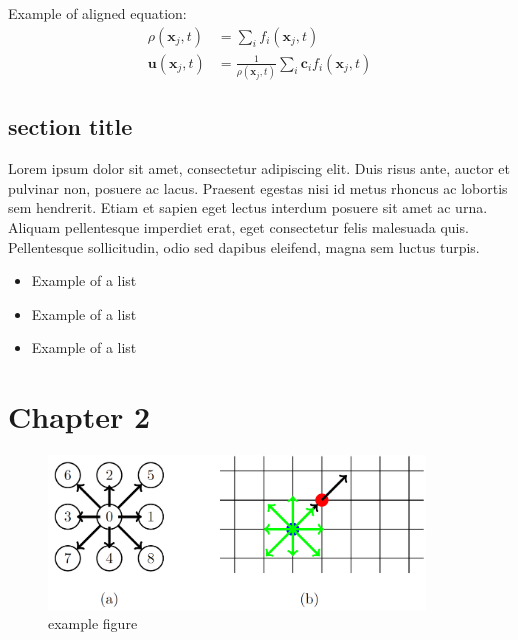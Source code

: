 \documentclass[a4paper,11pt]{report}
\begin{document}
    Example of aligned equation:
    \begin{align}
        \rho(\mathbf{x}_j, t) &= \sum_i f_i(\mathbf{x}_j, t) \\
        \mathbf{u}(\mathbf{x}_j, t) &= \frac{1}{ \rho(\mathbf{x}_j, t)}
        \sum_i \mathbf{c}_i f_i(\mathbf{x}_j, t)
    \end{align}


    \section{section title}
    Lorem ipsum dolor sit amet, consectetur adipiscing elit. Duis risus ante, auctor et pulvinar non, posuere ac lacus. Praesent egestas nisi id metus rhoncus ac lobortis sem hendrerit. Etiam et sapien eget lectus interdum posuere sit amet ac urna. Aliquam pellentesque imperdiet erat, eget consectetur felis malesuada quis. Pellentesque sollicitudin, odio sed dapibus eleifend, magna sem luctus turpis.

    \begin{itemize}
        \item Example of a list
        \item Example of a list
        \item Example of a list
    \end{itemize}


    \chapter{Chapter 2}

    \begin{figure}[h!]
        \begin{center}
            \includegraphics[width=10cm]{logos/Gitter_LBM.png}
            \caption{example figure}
            \label{fig:mesh}
        \end{center}
    \end{figure}
\end{document}
